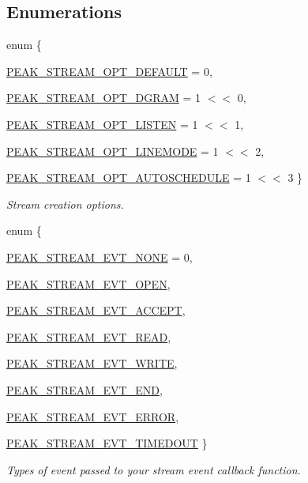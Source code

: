 \subsection*{Enumerations}
\begin{CompactItemize}
\item 
enum \{ \par
\hyperlink{group__stream_gga2a5}{PEAK\_\-STREAM\_\-OPT\_\-DEFAULT} =  0, 
\par
\hyperlink{group__stream_gga2a6}{PEAK\_\-STREAM\_\-OPT\_\-DGRAM} =  1 $<$$<$ 0, 
\par
\hyperlink{group__stream_gga2a7}{PEAK\_\-STREAM\_\-OPT\_\-LISTEN} =  1 $<$$<$ 1, 
\par
\hyperlink{group__stream_gga2a8}{PEAK\_\-STREAM\_\-OPT\_\-LINEMODE} =  1 $<$$<$ 2, 
\par
\hyperlink{group__stream_gga2a9}{PEAK\_\-STREAM\_\-OPT\_\-AUTOSCHEDULE} =  1 $<$$<$ 3
 \}
\begin{CompactList}\small\item\em Stream creation options. \item\end{CompactList}\item 
enum \{ \par
\hyperlink{group__stream_gga3a10}{PEAK\_\-STREAM\_\-EVT\_\-NONE} =  0, 
\par
\hyperlink{group__stream_gga3a11}{PEAK\_\-STREAM\_\-EVT\_\-OPEN}, 
\par
\hyperlink{group__stream_gga3a12}{PEAK\_\-STREAM\_\-EVT\_\-ACCEPT}, 
\par
\hyperlink{group__stream_gga3a13}{PEAK\_\-STREAM\_\-EVT\_\-READ}, 
\par
\hyperlink{group__stream_gga3a14}{PEAK\_\-STREAM\_\-EVT\_\-WRITE}, 
\par
\hyperlink{group__stream_gga3a15}{PEAK\_\-STREAM\_\-EVT\_\-END}, 
\par
\hyperlink{group__stream_gga3a16}{PEAK\_\-STREAM\_\-EVT\_\-ERROR}, 
\par
\hyperlink{group__stream_gga3a17}{PEAK\_\-STREAM\_\-EVT\_\-TIMEDOUT}
 \}
\begin{CompactList}\small\item\em Types of event passed to your stream event callback function. \item\end{CompactList}\end{CompactItemize}


